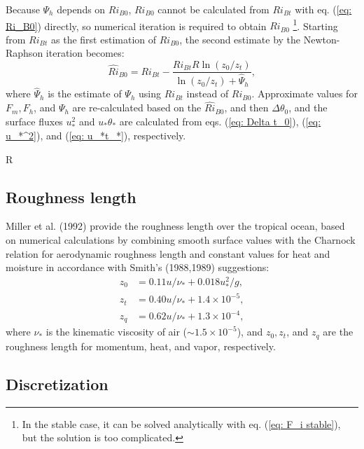 Because $\Psi_h$ depends on $Ri_{B0}$,
$Ri_{B0}$ cannot be calculated from $Ri_{Bt}$ with eq. (\ref{eq: Ri_B0})
directly, so numerical iteration is required to obtain $Ri_{B0}$
\footnote{In the stable case, it can be solved analytically
with eq. (\ref{eq: F_i stable}), but the solution is too complicated.}.
Starting from $Ri_{Bt}$ as the first estimation of $Ri_{B0}$,
the second estimate by the Newton-Raphson iteration becomes:
\begin{equation}
  \hat{Ri}_{B0} = Ri_{Bt} - \frac{Ri_{Bt}R\ln(z_0/z_t)}{\ln(z_0/z_t) + \hat{\Psi}_h},
  \label{eq: Ri_B0 estimation}
\end{equation}
where $\hat{\Psi}_h$ is the estimate of $\Psi_h$ using $Ri_{Bt}$ instead of $Ri_{B0}$.
Approximate values for $F_m, F_h$, and $\Psi_h$ are re-calculated
based on the $\hat{Ri}_{B0}$, and then $\Delta\theta_0$, and the surface fluxes $u_*^2$ and $u_*\theta_*$ are calculated from eqs. (\ref{eq: Delta t_0}), (\ref{eq: u_*^2}), and (\ref{eq: u_*t_*}), respectively.


R\subsection{Roughness length}
Miller et al. (1992) provide the roughness length over the tropical ocean,
based on numerical calculations by combining smooth surface values with the Charnock relation for aerodynamic roughness length and constant values for heat and moisture in accordance with Smith’s (1988,1989) suggestions:
\begin{align}
  z_0 &= 0.11u/\nu_* + 0.018u_*^2/g, \label{eq: z_0} \\
  z_t &= 0.40u/\nu_* + 1.4 \times 10^{-5}, \label{eq: z_t} \\
  z_q &= 0.62u/\nu_* + 1.3 \times 10^{-4}, \label{eq: z_q}
\end{align}
where $\nu_*$ is the kinematic viscosity of air ($\sim 1.5 \times 10^{-5}$), and $z_0, z_t$, and $z_q$ are the roughness length for momentum, heat, and vapor, respectively.



\subsection{Discretization}

\def\half{\frac{1}{2}}

